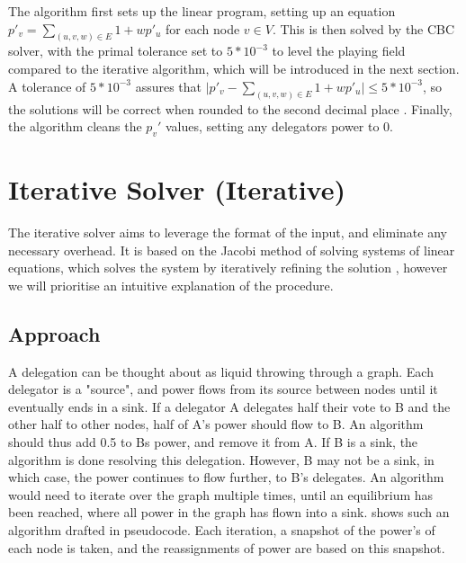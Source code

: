 The algorithm first sets up the linear program, setting up an equation $p'_v = \sum_{(u, v, w) \in E} 1 + wp'_u$ for each node $v \in V$. This is then solved by the CBC solver, with the primal tolerance set to $5*10^{-3}$ to level the playing field compared to the iterative algorithm, which will be introduced in the next section. A tolerance of $5 * 10^{-3}$ assures that $\lvert p'_v -\sum_{(u, v, w) \in E} 1 + wp'_u \rvert \le 5*10^{-3}$, so the solutions will be correct when rounded to the second decimal place \cite{forrestCBCUserGuide2005}. Finally, the algorithm cleans the $p_v'$ values, setting any delegators power to 0. 



\section{Iterative Solver (Iterative)}

The iterative solver aims to leverage the format of the input, and eliminate any necessary overhead. It is based on the Jacobi method of solving systems of linear equations, which solves the system by iteratively refining the solution , however we will prioritise an intuitive explanation of the procedure.

\subsection{Approach}

A delegation can be thought about as liquid throwing through a graph. Each delegator is a "source", and power flows from its source between nodes until it eventually ends in a sink. If a delegator A delegates half their vote to B and the other half to other nodes, half of A's power should flow to B. An algorithm should thus add 0.5 to Bs power, and remove it from A. If B is a sink, the algorithm is done resolving this delegation. However,  B may not be a sink, in which case, the power continues to flow further, to B's delegates. An algorithm would need to iterate over the graph multiple times, until an equilibrium has been reached, where all power in the graph has flown into a sink.  shows such an algorithm drafted in pseudocode. Each iteration, a snapshot of the power's of each node is taken, and the reassignments of power are based on this snapshot\footnotemark.  


